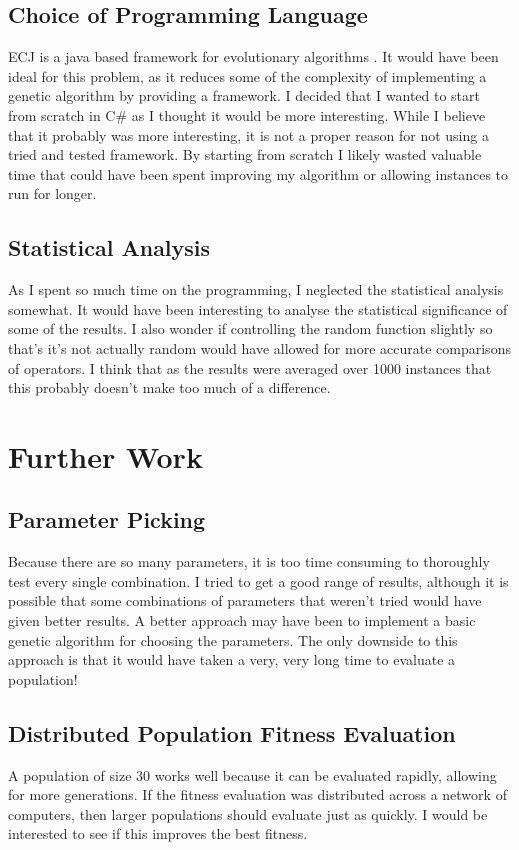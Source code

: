\documentclass[]{report}
\begin{document}
\subsection{Choice of Programming Language}
ECJ is a java based framework for evolutionary algorithms \cite{something}. It would have been ideal for this problem, as it reduces some of the complexity of implementing a genetic algorithm by providing a framework. I decided that I wanted to start from scratch in C\# as I thought it would be more interesting. While I believe that it probably was more interesting, it is not a proper reason for not using a tried and tested framework. By starting from scratch I likely wasted valuable time that could have been spent improving my algorithm or allowing instances to run for longer.

\subsection{Statistical Analysis}
As I spent so much time on the programming, I neglected the statistical analysis somewhat. It would have been interesting to analyse the statistical significance of some of the results. I also wonder if controlling the random function slightly so that's it's not actually random would have allowed for more accurate comparisons of operators. I think that as the results were averaged over 1000 instances that this probably doesn't make too much of a difference.

\section{Further Work}

\subsection{Parameter Picking}
Because there are so many parameters, it is too time consuming to thoroughly test every single combination. I tried to get a good range of results, although it is possible that some combinations of parameters that weren't tried would have given better results. A better approach may have been to implement a basic genetic algorithm for choosing the parameters. The only downside to this approach is that it would have taken a very, very long time to evaluate a population!

\subsection{Distributed Population Fitness Evaluation}
A population of size 30 works well because it can be evaluated rapidly, allowing for more generations. If the fitness evaluation was distributed across a network of computers, then larger populations should evaluate just as quickly. I would be interested to see if this improves the best fitness.
\end{document}
